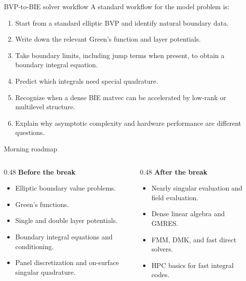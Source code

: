 \documentclass[aspectratio=169,11pt]{beamer}
\begin{document}
\begin{frame}{BVP-to-BIE solver workflow}
\small
A standard workflow for the model problem is:
\begin{enumerate}
  \item Start from a standard elliptic BVP and identify natural boundary data.
  \item Write down the relevant Green's function and layer potentials.
  \item Take boundary limits, including jump terms when present, to obtain a
  boundary integral equation.
  \item Predict which integrals need special quadrature.
  \item Recognize when a dense BIE matvec can be accelerated by low-rank or
  multilevel structure.
  \item Explain why asymptotic complexity and hardware performance are
  different questions.
\end{enumerate}
\end{frame}

\begin{frame}{Morning roadmap}
\small
\begin{columns}[T,totalwidth=\textwidth]
\begin{column}{0.48\textwidth}
\textbf{Before the break}
\begin{itemize}
  \item Elliptic boundary value problems.
  \item Green's functions.
  \item Single and double layer potentials.
  \item Boundary integral equations and conditioning.
  \item Panel discretization and on-surface singular quadrature.
\end{itemize}
\end{column}
\begin{column}{0.48\textwidth}
\textbf{After the break}
\begin{itemize}
  \item Nearly singular evaluation and field evaluation.
  \item Dense linear algebra and GMRES.
  \item FMM, DMK, and fast direct solvers.
  \item HPC basics for fast integral codes.
\end{itemize}
\end{column}
\end{columns}
\end{frame}
\end{document}
